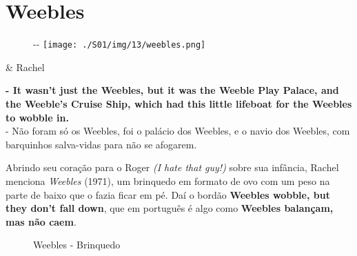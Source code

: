 \hypertarget{weebles}{%
\section{Weebles}\label{weebles}}

\begin{figure}[!ht]
  \begin{adjustwidth}{-\oddsidemargin-1in}{-\rightmargin}
    \centering
    \texttt{[image: ./S01/img/13/weebles.png]}
  \end{adjustwidth}
\end{figure}

\begin{tcolorbox}[enhanced,center upper,
    drop fuzzy shadow southeast, boxrule=0.3pt,
    lower separated=false, breakable,
    colframe=black!30!dialogoBorder,colback=white]
\begin{minipage}[c]{0.16\linewidth}
   & \centering \scriptsize{Rachel}
\end{minipage}
\hfill
\begin{minipage}[c]{0.8\linewidth}
  \textbf{- It wasn't just the Weebles, but it was the Weeble Play Palace, and the Weeble's Cruise Ship, which had this little lifeboat for the Weebles to wobble in.}\\
  - Não foram só os Weebles, foi o palácio dos Weebles, e o navio dos Weebles, com barquinhos salva-vidas para não se afogarem.
\end{minipage}
\end{tcolorbox}

Abrindo seu coração para o Roger \emph{(I hate that guy!)} sobre sua
infância, Rachel menciona \emph{Weebles} (1971), um brinquedo em formato
de ovo com um peso na parte de baixo que o fazia ficar em pé. Daí o
bordão \textbf{Weebles wobble, but they don't fall down}, que em
português é algo como \textbf{Weebles balançam, mas não caem}.

\begin{figure}
  \centering
    \caption{Weebles - Brinquedo\label{fig:weebles-brinquedo}}
\end{figure}

